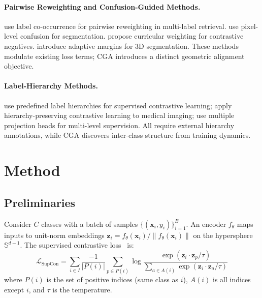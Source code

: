 \documentclass{article}
\newcommand{\lsupcon}{\mathcal{L}_{\text{SupCon}}}
\newcommand{\Sph}{\mathbb{S}}
\begin{document}
\paragraph{Pairwise Reweighting and Confusion-Guided Methods.}
\citet{gao2024macl} use label co-occurrence for pairwise reweighting in multi-label retrieval. \citet{chen2024dynamic} use pixel-level confusion for segmentation. \citet{wang2024mining} propose curricular weighting for contrastive negatives. \citet{duan2025adaptive} introduce adaptive margins for 3D segmentation. These methods modulate existing loss terms; CGA introduces a distinct geometric alignment objective.

\paragraph{Label-Hierarchy Methods.}
\citet{lian2024learning} use predefined label hierarchies for supervised contrastive learning; \citet{dorfner2025climbing} apply hierarchy-preserving contrastive learning to medical imaging; \citet{ghanooni2025multilevel} use multiple projection heads for multi-level supervision. All require external hierarchy annotations, while CGA discovers inter-class structure from training dynamics.

\section{Method}
\label{sec:method}

\subsection{Preliminaries}

Consider $C$ classes with a batch of samples $\{(\mathbf{x}_i, y_i)\}_{i=1}^{B}$. An encoder $f_\theta$ maps inputs to unit-norm embeddings $\mathbf{z}_i = f_\theta(\mathbf{x}_i) / \|f_\theta(\mathbf{x}_i)\|$ on the hypersphere $\Sph^{d-1}$. The supervised contrastive loss~\citep{khosla2020supervised} is:
\begin{equation}
\lsupcon = \sum_{i \in I} \frac{-1}{|P(i)|} \sum_{p \in P(i)} \log \frac{\exp(\mathbf{z}_i \cdot \mathbf{z}_p / \tau)}{\sum_{a \in A(i)} \exp(\mathbf{z}_i \cdot \mathbf{z}_a / \tau)}
\label{eq:supcon}
\end{equation}
where $P(i)$ is the set of positive indices (same class as $i$), $A(i)$ is all indices except $i$, and $\tau$ is the temperature.
\end{document}
